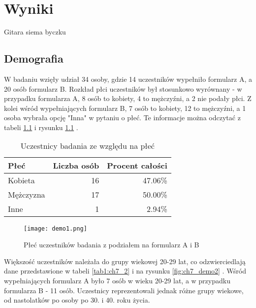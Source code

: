 \graphicspath{{chapters/chapter7/imgs/}}

\chapter{Wyniki}\label{chapter:ch7}

Gitara siema byczku

\section{Demografia}\label{section:ch7_1}

W badaniu wzięły udział 34 osoby, gdzie 14 uczestników wypełniło formularz A, a 20 osób formularz B.
Rozkład płci uczestników był stosunkowo wyrównany - w przypadku formularza A, 8 osób to kobiety, 4 to
mężczyźni, a 2 nie podały płci. Z kolei wśród wypełniających formularz B, 7 osób to kobiety, 12 to
mężczyźni, a 1 osoba wybrała opcję "Inna" w pytaniu o płeć. Te informacje można odczytać z tabeli \ref{tab1:ch7_1}
i rysunku \ref{fig:ch7_demo1} .

\begin{table}[h!]
    \begin{center}
        \begin{tabular}{|l|r|r|}
            \hline
            Płeć      & Liczba osób & Procent całości \\
            \hline
            Kobieta   & 16          & 47.06\%         \\
            Mężczyzna & 17          & 50.00\%         \\
            Inne      & 1           & 2.94\%          \\
            \hline
        \end{tabular}
    \end{center}
    \caption{Uczestnicy badania ze względu na płeć}\label{tab1:ch7_1}
\end{table}

\begin{figure}[h!]
    \centering
    \texttt{[image: demo1.png]}
    \caption{Płeć uczestników badania z podziałem na formularz A i B}
    \label{fig:ch7_demo1}
\end{figure}

Większość uczestników należała do grupy wiekowej 20-29 lat, co odzwierciedlają dane przedstawione w
tabeli \ref{tab1:ch7_2} i na rysunku \ref{fig:ch7_demo2} . Wśród wypełniających formularz A było 7 osób
w wieku 20-29 lat, a w przypadku formularza B - 11 osób. Uczestnicy reprezentowali jednak różne grupy
wiekowe, od nastolatków po osoby po 30. i 40. roku życia.

